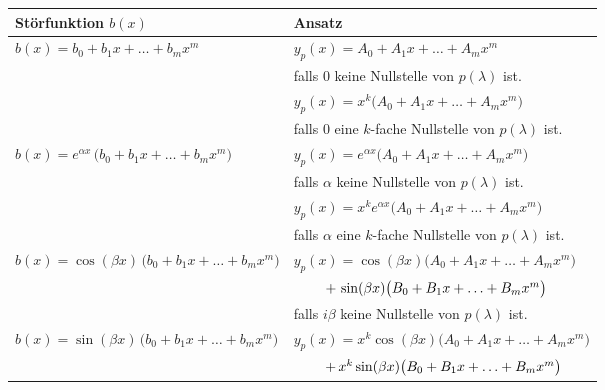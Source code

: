 \documentclass[a4paper,11pt,oneside,open=any,parskip=half, DIV=15]{scrreprt}
\begin{document}
   \begin{importantbox}
      \begin{center}
         \begin{tabular}{|p{}|p{}|}   %
            \hline   %
            \textbf{Störfunktion \(b(x)\)} & \textbf{Ansatz} \\
            \hline   %
            \(b(x)= b_0 + b_1 x + \ldots + b_m x^m\)  %
            &
            \(y_p(x)= A_0 + A_1 x + \ldots + A_m x^m\)\\ %
            & falls \(0\) keine Nullstelle von \(p(\lambda)\) ist.\\
            & \(y_p(x)= x^{k}\big(A_0 + A_1 x + \ldots + A_m x^m\big)\)\\  %
            & falls \(0\) eine \(k\)-fache Nullstelle von \(p(\lambda)\) ist.\\
            \hline   %
            \(b(x)= e^{\alpha x}\,\big(b_0 + b_1 x + \ldots + b_m x^m\big)\)  %
            &
            \(y_p(x)= e^{\alpha x}\big(A_0 + A_1 x + \ldots + A_m x^m\big)\)\\   %
            & falls \(\alpha\) keine Nullstelle von \(p(\lambda)\) ist.\\
            & \(y_p(x)= x^{k} e^{\alpha x}\big(A_0 + A_1 x + \ldots + A_m x^m\big)\)\\ %
            & falls \(\alpha\) eine \(k\)-fache Nullstelle von \(p(\lambda)\) ist.\\
            \hline   %
            \(b(x)= \cos(\beta x)\,\big(b_0 + b_1 x + \ldots + b_m x^m\big)\) %
            &
            \(y_p(x)= \cos(\beta x)\big(A_0 + A_1 x + \ldots + A_m x^m\big)\)\\  %
            & \(\hspace{2.2em}+\, \sin(\beta x)\big(B_0 + B_1 x + \ldots + B_m x^m\big)\)\\  %
            & falls \(i\beta\) keine Nullstelle von \(p(\lambda)\) ist.\\
            \(b(x)= \sin(\beta x)\,\big(b_0 + b_1 x + \ldots + b_m x^m\big)\) %
            &
            \(y_p(x)= x^{k}\cos(\beta x)\big(A_0 + A_1 x + \ldots + A_m x^m\big)\)\\   %
            & \(\hspace{2.2em}+\, x^{k}\sin(\beta x)\big(B_0 + B_1 x + \ldots + B_m x^m\big)\)\\  %

\end{tabular}
\end{center}
\end{importantbox}
\end{document}
